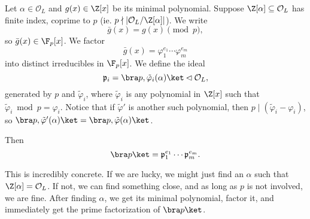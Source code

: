 \documentclass[a4paper]{article}
\begin{document}
\begin{thm}
  Let $\alpha \in \mathcal{O}_L$ and $g(x) \in \Z[x]$ be its minimal polynomial. Suppose $\Z[\alpha] \subseteq \mathcal{O}_L$ has finite index, coprime to $p$ (ie. $p \nmid |\mathcal{O}_L/\Z[\alpha]|$). We write
  \[
    \bar{g}(x) = g(x) \pmod p,
  \]
  so $\bar{g}(x) \in \F_p[x]$. We factor
  \[
    \bar{g}(x) = \varphi_1^{e_1} \cdots \varphi_m^{e_m}
  \]
  into distinct irreducibles in $\F_p[x]$. We define the ideal
  \[
    \mathfrak{p}_i = \bra p, \tilde{\varphi}_i(\alpha)\ket \lhd \mathcal{O}_L,
  \]
  generated by $p$ and $\tilde{\varphi}_i$, where $\tilde{\varphi}_i$ is any polynomial in $\Z[x]$ such that $\tilde{\varphi}_i \bmod p = \varphi_i$. Notice that if $\tilde{\varphi}'$ is another such polynomial, then $p \mid (\tilde{\varphi}_i - \varphi_i)$, so $\bra p, \tilde{\varphi}'(\alpha)\ket = \bra p, \tilde{\varphi}(\alpha)\ket$.

  Then
  \[
    \bra p\ket = \mathfrak{p}_1^{e_1} \cdots \mathfrak{p}_m^{e_m}.
  \]
\end{thm}
This is incredibly concrete. If we are lucky, we might just find an $\alpha$ such that $\Z[\alpha] = \mathcal{O}_L$. If not, we can find something close, and as long as $p$ is not involved, we are fine. After finding $\alpha$, we get its minimal polynomial, factor it, and immediately get the prime factorization of $\bra p\ket$.
\end{document}
